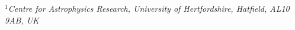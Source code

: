 $^{1}$\footnotesize{\textit{Centre for Astrophysics Research, University of Hertfordshire, Hatfield, AL10 9AB, UK}} \\
